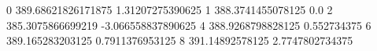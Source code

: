 0 389.68621826171875 1.31207275390625
1 388.3741455078125 0.0
2 385.3075866699219 -3.066558837890625
4 388.9268798828125 0.552734375
6 389.165283203125 0.7911376953125
8 391.14892578125 2.7747802734375
